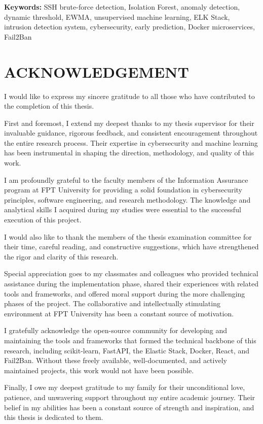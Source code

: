 \documentclass[
  a4paper]{report}
\begin{document}
\textbf{Keywords:} SSH brute-force detection, Isolation Forest, anomaly
detection, dynamic threshold, EWMA, unsupervised machine learning, ELK
Stack, intrusion detection system, cybersecurity, early prediction,
Docker microservices, Fail2Ban

\section{ACKNOWLEDGEMENT}\label{acknowledgement}

I would like to express my sincere gratitude to all those who have
contributed to the completion of this thesis.

First and foremost, I extend my deepest thanks to my thesis supervisor
for their invaluable guidance, rigorous feedback, and consistent
encouragement throughout the entire research process. Their expertise in
cybersecurity and machine learning has been instrumental in shaping the
direction, methodology, and quality of this work.

I am profoundly grateful to the faculty members of the Information
Assurance program at FPT University for providing a solid foundation in
cybersecurity principles, software engineering, and research
methodology. The knowledge and analytical skills I acquired during my
studies were essential to the successful execution of this project.

I would also like to thank the members of the thesis examination
committee for their time, careful reading, and constructive suggestions,
which have strengthened the rigor and clarity of this research.

Special appreciation goes to my classmates and colleagues who provided
technical assistance during the implementation phase, shared their
experiences with related tools and frameworks, and offered moral support
during the more challenging phases of the project. The collaborative and
intellectually stimulating environment at FPT University has been a
constant source of motivation.

I gratefully acknowledge the open-source community for developing and
maintaining the tools and frameworks that formed the technical backbone
of this research, including scikit-learn, FastAPI, the Elastic Stack,
Docker, React, and Fail2Ban. Without these freely available,
well-documented, and actively maintained projects, this work would not
have been possible.

Finally, I owe my deepest gratitude to my family for their unconditional
love, patience, and unwavering support throughout my entire academic
journey. Their belief in my abilities has been a constant source of
strength and inspiration, and this thesis is dedicated to them.
\end{document}
